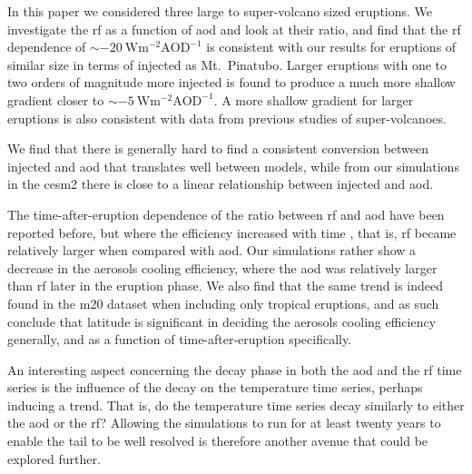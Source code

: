 \documentclass{ametsocV6.1}
\newcommand{\iso}[1][i]{{#1}njected \ce{SO2}}
\begin{document}
In this paper we considered three large to super-volcano sized eruptions. We investigate
the \gls{rf} as a function of \gls{aod} and look at their ratio, and find that the
\gls{rf} dependence of \(\sim\SI{-20}{\watt\metre^{-2}\mathrm{AOD}^{-1}}\) is consistent
with our results for eruptions of similar size in terms of \iso{} as Mt.\ Pinatubo.
Larger eruptions with one to two orders of magnitude more \iso{} is found to produce a
much more shallow gradient closer to \(\sim
\SI{-5}{\watt\metre^{-2}\mathrm{AOD}^{-1}}\). A more shallow gradient for larger
eruptions is also consistent with data from previous studies of super-volcanoes.

We find that there is generally hard to find a consistent conversion between \iso{} and
\gls{aod} that translates well between models, while from our simulations in the
\gls{cesm2} there is close to a linear relationship between \iso{} and \gls{aod}.

The time-after-eruption dependence of the ratio between \gls{rf} and \gls{aod} have been
reported before, but where the efficiency increased with time \citep{marshall2020}, that
is, \gls{rf} became relatively larger when compared with \gls{aod}. Our simulations
rather show a decrease in the aerosols cooling efficiency, where the \gls{aod} was
relatively larger than \gls{rf} later in the eruption phase. We also find that the same
trend is indeed found in the \gls{m20} dataset when including only tropical eruptions,
and as such conclude that latitude is significant in deciding the aerosols cooling
efficiency generally, and as a function of time-after-eruption specifically.

An interesting aspect concerning the decay phase in both the \gls{aod} and the \gls{rf}
time series is the influence of the decay on the temperature time series, perhaps
inducing a trend. That is, do the temperature time series decay similarly to either the
\gls{aod} or the \gls{rf}? Allowing the simulations to run for at least twenty years to
enable the tail to be well resolved is therefore another avenue that could be explored
further.

\clearpage
\acknowledgments{}
\end{document}
